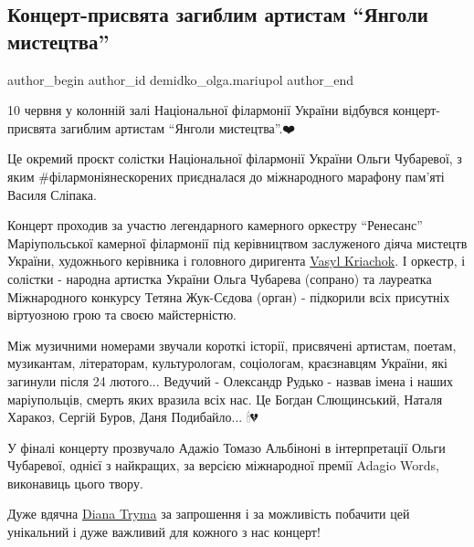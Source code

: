  
 
 
 
 

\subsection{Концерт-присвята загиблим артистам \enquote{Янголи мистецтва}}
\label{sec:10_06_2023.fb.demidko_olga.mariupol.1.jangoly_mystectva_koncert}

\ifcmt
 author_begin
   author_id demidko_olga.mariupol
 author_end
\fi

10 червня у колонній залі Національної філармонії України  відбувся
концерт-присвята загиблим артистам \enquote{Янголи мистецтва}.❤️

Це окремий проєкт солістки Національної філармонії України Ольги Чубаревої, з
яким \#філармоніянескорених приєдналася до міжнародного марафону пам'яті Василя
Сліпака.

Концерт проходив за участю легендарного камерного оркестру \enquote{Ренесанс}
Маріупольської камерної філармонії під керівництвом заслуженого діяча мистецтв
України, художнього керівника і головного диригента
\href{https://www.facebook.com/profile.php?id=100005138506360}{Vasyl Kriachok}.
І оркестр, і солістки - народна артистка України  Ольга Чубарева (сопрано) та
лауреатка Міжнародного конкурсу Тетяна Жук-Сєдова (орган) - підкорили всіх
присутніх віртуозною грою та своєю майстерністю.

Між музичними номерами звучали короткі історії, присвячені артистам, поетам,
музикантам, літераторам, культурологам, соціологам, краєзнавцям України, які
загинули після 24 лютого... Ведучий - Олександр Рудько - назвав імена і наших
маріупольців, смерть яких вразила всіх нас. Це Богдан Слющинський, Наталя
Харакоз, Сергій Буров, Даня Подибайло... 🕯💔

У фіналі концерту прозвучало Адажіо Томазо Альбіноні в інтерпретації Ольги
Чубаревої, однієї з найкращих, за версією міжнародної премії Adagio Words,
виконавиць цього твору. 

Дуже вдячна
\href{https://www.facebook.com/profile.php?id=100002192860709}{Diana Tryma} за
запрошення і за можливість побачити цей унікальний і дуже важливий для кожного
з нас концерт!
